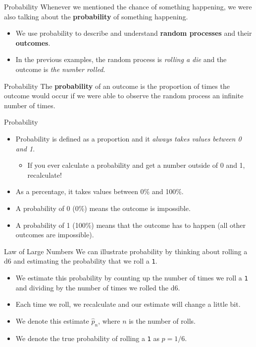 \begin{frame}{Probability}
    Whenever we mentioned the chance of something happening, we were also talking about the \textbf{probability} of something happening.
    \begin{itemize}
        \item We use probability to describe and understand \textbf{random processes} and their \textbf{outcomes}.
        \item In the previous examples, the random process is \textit{rolling a die} and the outcome is \textit{the number rolled}.
    \end{itemize}
\end{frame}

\begin{frame}{Probability}
    The \textbf{probability} of an outcome is the proportion of times the outcome would occur if we were able to observe the random process an infinite number of times.
\end{frame}

\begin{frame}{Probability}
    \begin{itemize}
        \item Probability is defined as a proportion and it \textit{always takes values between 0 and 1}.
        \begin{itemize}
            \item If you ever calculate a probability and get a number outside of 0 and 1, recalculate!
        \end{itemize}
        \item As a percentage, it takes values between 0\% and 100\%.
        \item A probability of 0 (0\%) means the outcome is impossible. 
        \item A probability of 1 (100\%) means that the outcome has to happen (all other outcomes are impossible).
    \end{itemize}
\end{frame}

\begin{frame}{Law of Large Numbers}
    We can illustrate probability by thinking about rolling a d6 and estimating the probability that we roll a \texttt{1}.
    \begin{itemize}
        \item We estimate this probability by counting up the number of times we roll a \texttt{1} and dividing by the number of times we rolled the d6.
        \item Each time we roll, we recalculate and our estimate will change a little bit.
        \item We denote this estimate $\hat{p}_n$, where $n$ is the number of rolls.
        \item We denote the true probability of rolling a \texttt{1} as $p=1/6$.
    \end{itemize}
\end{frame}

